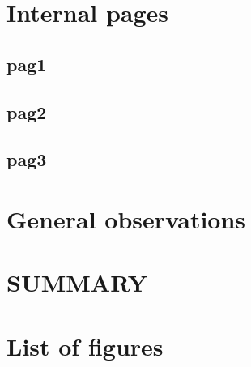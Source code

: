 \documentclass[
12pt, %
a4paper, %
oneside, %
headinclude,footinclude, %
BCOR5mm, %
]{scrartcl}
\begin{document}

\section{Internal pages}
	
	\subsection{pag1}

	\subsection{pag2}

	\subsection{pag3}



\section{General observations}



\section{SUMMARY}



\section{List of figures}

\end{document}
